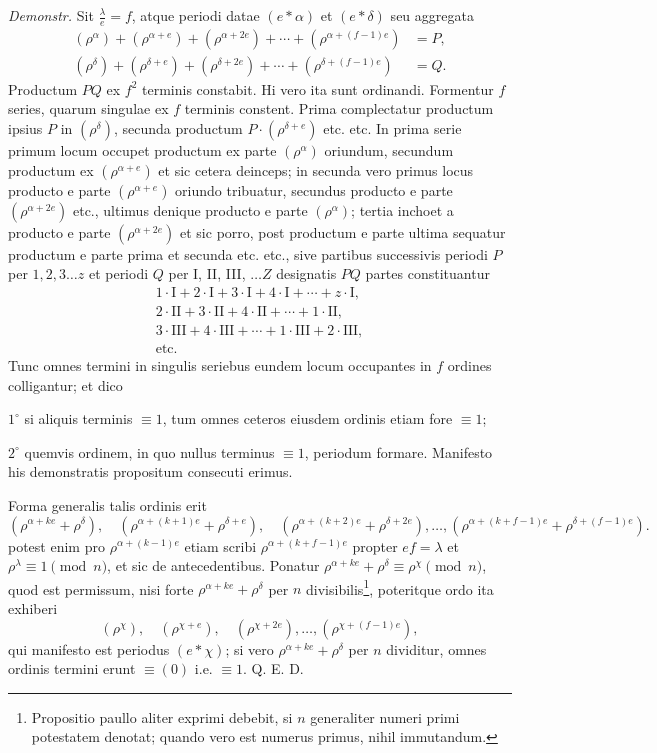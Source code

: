 \documentclass[12pt]{article}
\begin{document}
\textit{Demonstr.} Sit $\frac{\lambda}{e}=f$, atque periodi datae $(e*\alpha)$ et $(e*\delta)$ seu aggregata
\[
\begin{aligned}
(\rho^\alpha)+(\rho^{\alpha+e})+(\rho^{\alpha+2e})+\cdots+(\rho^{\alpha+(f-1)e})&=P,\\
(\rho^\delta)+(\rho^{\delta+e})+(\rho^{\delta+2e})+\cdots+(\rho^{\delta+(f-1)e})&=Q.
\end{aligned}
\]
Productum $PQ$ ex $f^2$ terminis constabit. Hi vero ita sunt ordinandi. Formentur $f$ series, quarum singulae ex $f$ terminis constent. Prima complectatur productum ipsius $P$ in $(\rho^\delta)$, secunda productum $P\cdot(\rho^{\delta+e})$ etc. etc. In prima serie primum locum occupet productum ex parte $(\rho^\alpha)$ oriundum, secundum productum ex $(\rho^{\alpha+e})$ et sic cetera deinceps; in secunda vero primus locus producto e parte $(\rho^{\alpha+e})$ oriundo tribuatur, secundus producto e parte $(\rho^{\alpha+2e})$ etc., ultimus denique producto e parte $(\rho^\alpha)$; tertia inchoet a producto e parte $(\rho^{\alpha+2e})$ et sic porro, post productum e parte ultima sequatur productum e parte prima et secunda etc. etc., sive partibus successivis periodi $P$ per $1,2,3\ldots z$ et periodi $Q$ per I, II, III, $\ldots Z$ designatis $PQ$ partes constituantur
\[
\begin{array}{l}
1\cdot\mathrm{I}+2\cdot\mathrm{I}+3\cdot\mathrm{I}+4\cdot\mathrm{I}+\cdots+z\cdot\mathrm{I},\\
2\cdot\mathrm{II}+3\cdot\mathrm{II}+4\cdot\mathrm{II}+\cdots+1\cdot\mathrm{II},\\
3\cdot\mathrm{III}+4\cdot\mathrm{III}+\cdots+1\cdot\mathrm{III}+2\cdot\mathrm{III},\\
\text{etc.}
\end{array}
\]
Tunc omnes termini in singulis seriebus eundem locum occupantes in $f$ ordines colligantur; et dico

$1^\circ$ si aliquis terminis $\equiv 1$, tum omnes ceteros eiusdem ordinis etiam fore $\equiv 1$;

$2^\circ$ quemvis ordinem, in quo nullus terminus $\equiv 1$, periodum formare. Manifesto his demonstratis propositum consecuti erimus.

Forma generalis talis ordinis erit
\[
(\rho^{\alpha+ke}+\rho^\delta),\quad (\rho^{\alpha+(k+1)e}+\rho^{\delta+e}),\quad (\rho^{\alpha+(k+2)e}+\rho^{\delta+2e}),\ldots, (\rho^{\alpha+(k+f-1)e}+\rho^{\delta+(f-1)e}).
\]
potest enim pro $\rho^{\alpha+(k-1)e}$ etiam scribi $\rho^{\alpha+(k+f-1)e}$ propter $ef=\lambda$ et $\rho^\lambda\equiv 1\pmod n$, et sic de antecedentibus. Ponatur $\rho^{\alpha+ke}+\rho^\delta\equiv \rho^\chi\pmod n$, quod est permissum, nisi forte $\rho^{\alpha+ke}+\rho^\delta$ per $n$ divisibilis\footnote{Propositio paullo aliter exprimi debebit, si $n$ generaliter numeri primi potestatem denotat; quando vero est numerus primus, nihil immutandum.}, poteritque ordo ita exhiberi
\[
(\rho^\chi),\quad (\rho^{\chi+e}),\quad (\rho^{\chi+2e}),\ldots,(\rho^{\chi+(f-1)e}),
\]
qui manifesto est periodus $(e*\chi)$; si vero $\rho^{\alpha+ke}+\rho^\delta$ per $n$ dividitur, omnes ordinis termini erunt $\equiv(0)$ i.e. $\equiv 1$. Q. E. D.
\end{document}
